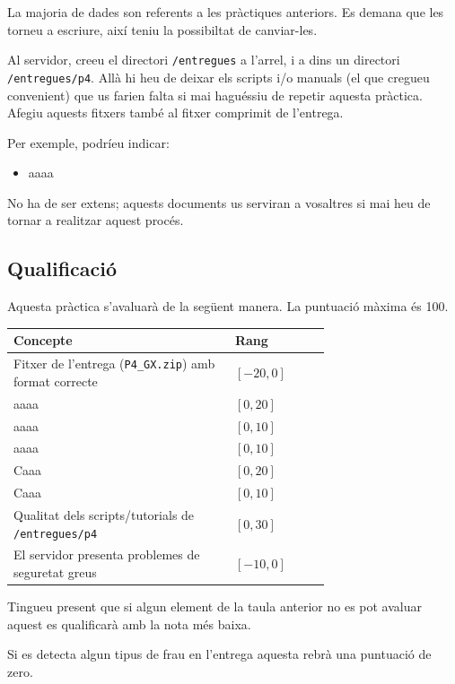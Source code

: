 \documentclass{practicaitic}
\begin{document}
La majoria de dades son referents a les pràctiques anteriors. Es demana
que les torneu a escriure, així teniu la possibiltat de canviar-les.

Al servidor, creeu el directori \texttt{/entregues} a l'arrel, i a dins un
directori \texttt{/entregues/p4}. Allà hi heu de deixar els scripts i/o manuals
(el que cregueu convenient) que us farien falta si mai haguéssiu de repetir
aquesta pràctica. Afegiu aquests fitxers també al fitxer comprimit de l'entrega.

Per exemple, podríeu indicar:
\begin{itemize}
  \item aaaa
\end{itemize}

No ha de ser extens; aquests documents us serviran a vosaltres si mai heu de
tornar a realitzar aquest procés.

\subsection{Qualificació}

Aquesta pràctica s'avaluarà de la següent manera. La puntuació màxima és 100.

\begin{center}%
  \begin{tabular}{p{0.7\linewidth} l}
  \hline
  Concepte & Rang \\ \hline
  Fitxer de l'entrega (\texttt{P4\_GX.zip}) amb format correcte & $[-20, 0]$ \\
  aaaa & $[0, 20]$ \\
  aaaa & $[0, 10]$ \\
  aaaa & $[0, 10]$ \\
  Caaa & $[0, 20]$ \\
  Caaa & $[0, 10]$ \\
  Qualitat dels scripts/tutorials de \texttt{/entregues/p4} & $[0,30]$ \\
  El servidor presenta problemes de seguretat greus & $[-10,0]$ \\
  \hline
  \end{tabular}
\end{center}

Tingueu present que si algun element de la taula anterior no es pot avaluar
aquest es qualificarà amb la nota més baixa.

Si es detecta algun tipus de frau en l'entrega aquesta rebrà una puntuació de zero.
\end{document}
